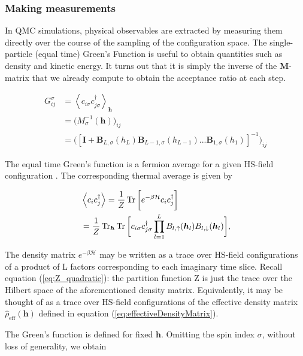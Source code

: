 \subsubsection{Making measurements}

In QMC simulations, physical observables are extracted by measuring them directly over the course of the sampling of the  configuration space. The single-particle (equal time) Green's Function is useful to obtain quantities such as density and kinetic energy. It turns out that it is simply the inverse of the $\bm M$-matrix that we already compute to obtain the acceptance ratio at each step.

\begin{equation}
\begin{split}
G_{ij}^\sigma &= \left\langle c_{i\sigma} c_{j\sigma}^\dagger \right\rangle_{\bm h} \\
&= \bigg( M_\sigma^{-1} (\bm h) \bigg)_{ij} \\
&= \bigg( [\bm I + \bm B_{L,\sigma} ( h_L ) \bm B_{L-1,\sigma} ( h_{L-1} ) ... \bm B_{1,\sigma} ( h_1 ) ]^{-1} \bigg)_{ij}
\end{split}
\end{equation}

The equal time Green's function is a fermion average for a given HS-field configuration \cite{Santos2003}. The corresponding thermal average is given by

\begin{equation}
\begin{split}
&\left\langle c_i c_j^\dagger \right\rangle = \frac{1}{Z} \operatorname{Tr} \bigg[ e^{-\beta \mathcal{H}} c_i c_j^\dagger \bigg] \\
&= \frac{1}{Z} \operatorname{Tr}_{\bm h} \operatorname{Tr} \bigg[ c_{i\sigma} c_{j\sigma}^\dagger \prod_{l=1}^L  B_{l, \uparrow}(\bm h_l) 
B_{l, \downarrow}(\bm h_l) \bigg],
\end{split}
\end{equation}

The density matrix $e^{-\beta\mathcal{H} }$ may be written as a trace over HS-field configurations of a product of L factors corresponding to each imaginary time slice. Recall equation (\ref{eq:Z_quadratic}): the partition function Z is just the trace over the Hilbert space of the aforementioned density matrix. Equivalently, it may be thought of as a trace over HS-field configurations of the effective density matrix $\hat{\rho}_{\text{eff}}(\bm h)$ defined in equation (\ref{eq:effectiveDensityMatrix}).

The Green's function is defined for fixed $\bm h$. Omitting the spin index $\sigma$, without loss of generality, we obtain 

